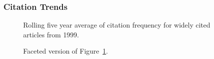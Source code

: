 \documentclass[
  10pt,
  letterpaper,
  DIV=11,
  numbers=noendperiod,
  twoside]{scrartcl}
\begin{document}
\subsubsection*{Citation Trends}\label{sec-trends-1999}

\begin{figure}


\caption{\label{fig-citation-spaghetti-1999}Rolling five year average of
citation frequency for widely cited articles from 1999.}

\end{figure}%

\begin{figure}


\caption{\label{fig-citation-facet-1999}Faceted version of
Figure~\ref{fig-citation-spaghetti-1999}.}

\end{figure}%
\end{document}
